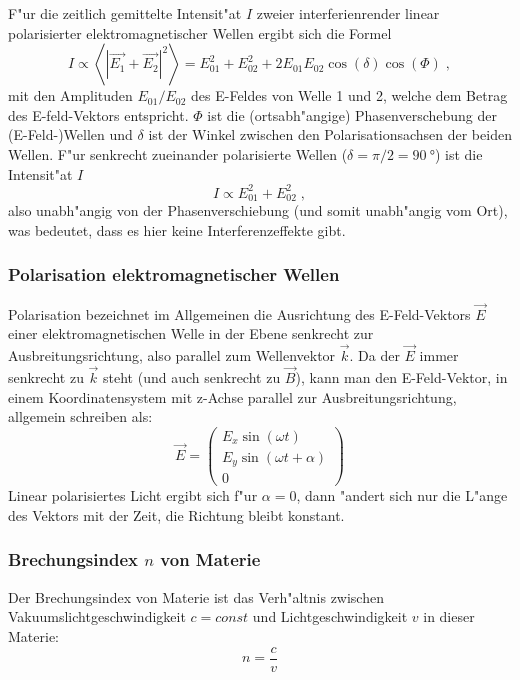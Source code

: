     F"ur die zeitlich gemittelte Intensit"at $I$ zweier interferienrender linear polarisierter elektromagnetischer Wellen ergibt sich die Formel
    \begin{equation}
      I \propto \left<\left|\vec{E_1}+\vec{E_2}\right|^2\right>
      =E_{01}^2 + E_{02}^2 + 2E_{01}E_{02}\cos{(\delta)}\cos{(\Phi)} \; ,
      \label{intensitaet}
    \end{equation}
    mit den Amplituden $E_{01}/E_{02}$ des E-Feldes von Welle 1 und 2, welche dem Betrag des E-feld-Vektors entspricht.
    $\Phi$ ist die (ortsabh"angige) Phasenverschebung der (E-Feld-)Wellen und $\delta$ ist der Winkel zwischen den Polarisationsachsen der beiden Wellen.
    F"ur senkrecht zueinander polarisierte Wellen ($\delta=\pi/2=\SI{90}{\degree}$) ist die Intensit"at $I$
    \begin{equation}
      I \propto E_{01}^2 + E_{02}^2 \; ,
    \end{equation}
    also unabh"angig von der Phasenverschiebung (und somit unabh"angig vom Ort), was bedeutet, dass es hier keine Interferenzeffekte gibt.

    \subsubsection{Polarisation elektromagnetischer Wellen}
      Polarisation bezeichnet im Allgemeinen die Ausrichtung des E-Feld-Vektors $\vec{E}$ einer elektromagnetischen Welle in der Ebene senkrecht zur Ausbreitungsrichtung, also parallel  zum Wellenvektor $\vec{k}$.
      Da der $\vec{E}$ immer senkrecht zu $\vec{k}$ steht (und auch senkrecht zu $\vec{B}$), kann man den E-Feld-Vektor, in einem Koordinatensystem mit z-Achse parallel zur Ausbreitungsrichtung, allgemein schreiben als:
      \begin{equation}
        \vec{E}= \left( \begin{array}{c}E_x\sin{(\omega t)}\\E_y\sin{(\omega t + \alpha)}\\0\end{array} \right)
      \end{equation}
      Linear polarisiertes Licht ergibt sich f"ur $\alpha=0$, dann "andert sich nur die L"ange des Vektors mit der Zeit, die Richtung bleibt konstant.

    \subsubsection{Brechungsindex $n$ von Materie}
      Der Brechungsindex von Materie ist das Verh"altnis zwischen Vakuumslichtgeschwindigkeit $c=const$ und Lichtgeschwindigkeit $v$ in dieser Materie:
      \begin{equation}
        n=\frac{c}{v}
        \label{brechungsindex}
      \end{equation}




